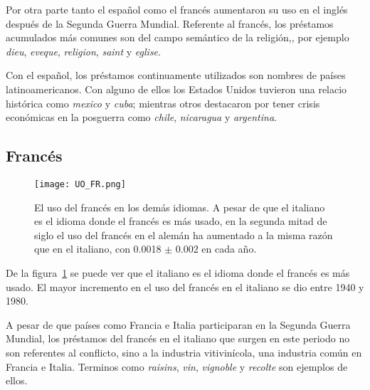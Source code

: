 Por otra parte tanto el español como el francés aumentaron su uso en el inglés después de la Segunda Guerra Mundial. Referente al francés, los préstamos acumulados más comunes son del campo semántico de la religión,, por ejemplo \textit{dieu}, \textit{eveque}, \textit{religion}, \textit{saint} y \textit{eglise}.

Con el español, los préstamos continuamente utilizados son nombres de países latinoamericanos. Con alguno de ellos los Estados Unidos tuvieron una relacio histórica como \textit{mexico} y \textit{cuba}; mientras otros destacaron por tener crisis económicas en la posguerra como \textit{chile}, \textit{nicaragua} y \textit{argentina}.  


 





\subsection{Francés} %

\begin{figure}[h!]
	\centering
	\texttt{[image: UO\_FR.png]}
	\caption{El uso del francés en los demás idiomas. A pesar de que el italiano es el idioma donde el francés es más usado,  en la segunda mitad de siglo el uso del francés en el alemán ha aumentado a la misma razón que en el italiano, con 0.0018 $\pm$ 0.002 en cada año.}
	\label{fig.UO_FR}
\end{figure}

De la figura~\ref{fig.UO_FR} se puede ver que el italiano es el idioma donde el francés es más usado. El mayor incremento en el uso del francés en el italiano se dio entre 1940 y 1980. 

A pesar de que países como Francia e Italia  participaran en la Segunda Guerra Mundial,  los préstamos del francés en el italiano que surgen en este periodo no son referentes al conflicto, sino a la industria vitivinícola, una industria común en Francia e Italia. Terminos como \textit{raisins}, \textit{vin}, \textit{vignoble} y \textit{recolte} son ejemplos de ellos. 

